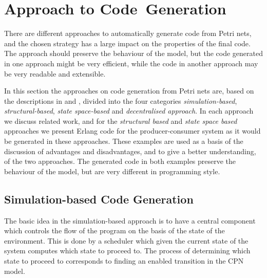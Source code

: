 \chapter{Approach to Code~Generation}
\label{chap:codegeneration}
There are different approaches to automatically generate code from Petri nets, and the chosen strategy has a large impact on the properties of the final code. The approach should preserve the behaviour of the model, but the code generated in one approach might be very efficient, while the code in another approach may be very readable and extensible.

In this section the approaches on code generation from Petri nets are, based on the descriptions in \cite{RefWorks:4} and \cite{RefWorks:5}, divided into the four categories \emph{simulation-based}, \emph{structural-based}, \emph{state space-based} and \emph{decentralised approach}. In each approach we discuss related work, and for the \emph{structural based} and \emph{state space based} approaches we present Erlang code for the producer-consumer system as it would be generated in these approaches. These examples are used as a basis of the discussion of advantages and disadvantages, and to give a better understanding, of the two approaches. The generated code in both examples preserve the behaviour of the model, but are very different in programming style.

\section{Simulation-based Code Generation}
The basic idea in the simulation-based approach is to have a central component which controls the flow of the program on the basis of the state of the environment. This is done by a scheduler which given the current state of the system computes which state to proceed to. The process of determining which state to proceed to corresponds to finding an enabled transition in the CPN model.

